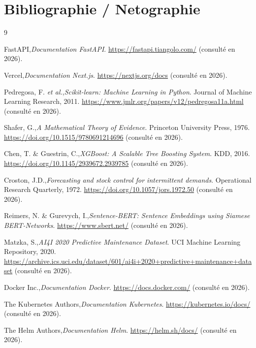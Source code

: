 \chapter*{Bibliographie / Netographie}

\begin{thebibliography}{9}

FastAPI,\emph{Documentation FastAPI}. \url{https://fastapi.tiangolo.com/} (consulté en 2026).

Vercel,\emph{Documentation Next.js}. \url{https://nextjs.org/docs} (consulté en 2026).

Pedregosa, F. \emph{et al.},\emph{Scikit-learn: Machine Learning in Python}. Journal of Machine Learning Research, 2011. \url{https://www.jmlr.org/papers/v12/pedregosa11a.html} (consulté en 2026).

Shafer, G.,\emph{A Mathematical Theory of Evidence}. Princeton University Press, 1976. \url{https://doi.org/10.1515/9780691214696} (consulté en 2026).

Chen, T. \& Guestrin, C.,\emph{XGBoost: A Scalable Tree Boosting System}. KDD, 2016. \url{https://doi.org/10.1145/2939672.2939785} (consulté en 2026).

Croston, J.D.,\emph{Forecasting and stock control for intermittent demands}. Operational Research Quarterly, 1972. \url{https://doi.org/10.1057/jors.1972.50} (consulté en 2026).

Reimers, N. \& Gurevych, I.,\emph{Sentence-BERT: Sentence Embeddings using Siamese BERT-Networks}. \url{https://www.sbert.net/} (consulté en 2026).

Matzka, S.,\emph{AI4I 2020 Predictive Maintenance Dataset}. UCI Machine Learning Repository, 2020. \url{https://archive.ics.uci.edu/dataset/601/ai4i+2020+predictive+maintenance+dataset} (consulté en 2026).

Docker Inc.,\emph{Documentation Docker}. \url{https://docs.docker.com/} (consulté en 2026).

The Kubernetes Authors,\emph{Documentation Kubernetes}. \url{https://kubernetes.io/docs/} (consulté en 2026).

The Helm Authors,\emph{Documentation Helm}. \url{https://helm.sh/docs/} (consulté en 2026).


\end{thebibliography}
